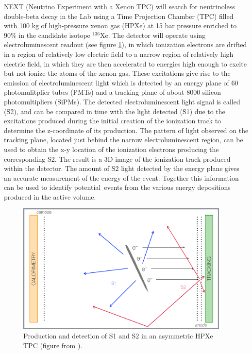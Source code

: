 \documentclass[a4paper,11pt]{article}
\begin{document}
NEXT (Neutrino Experiment with a Xenon TPC) \cite{Gomez-Cadenas:2014dxa} will search for neutrinoless double-beta decay in the Lab using a Time Projection Chamber (TPC) filled with 100 kg of 
high-pressure xenon gas (HPXe) at 15 bar pressure enriched to 90\% in the candidate isotope $^{136}$Xe.  The detector will operate using electroluminescent readout (see figure \ref{fig.SS}), in which 
ionization electrons are drifted in a region of relatively low electric field to a narrow region of relatively high electric field, in which they are then accelerated to energies high enough to excite but not 
ionize the atoms of the xenon gas.  These excitations give rise to the emission of electroluminescent light which is detected by an energy plane of 60 photomulitplier tubes (PMTs) and a tracking 
plane of about 8000 silicon photomultipliers (SiPMs).  The detected electroluminescent light signal is called (S2), and can be compared in time with the light detected (S1) due to the excitations 
produced during the initial creation of the ionization track to determine the z-coordinate of its production.  The pattern of light observed on the tracking plane, located just behind the narrow 
electroluminescent region, can be used to obtain the x-y location of the ionization electrons producing the corresponding S2.  The result is a 3D image of the ionization track produced within the 
detector.  The amount of S2 light detected by the energy plane gives an accurate measurement of the energy of the event.  Together this information can be used to identify potential 
\bbonu\,events from the various energy depositions produced in the active volume.

\begin{figure}[!htb]
	\centering
	\includegraphics[width= 0.95\textwidth]{fig/SoftAsymmetric_bound.pdf}
	\caption{Production and detection of S1 and S2 in an asymmetric HPXe TPC (figure from \cite{MartinAlbo_thesis}).} \label{fig.SS}
\end{figure}
\end{document}
